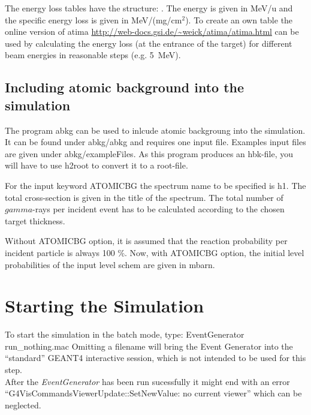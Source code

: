 \documentclass[12pt]{book}
\begin{document}
The energy loss tables have the structure: \hfill{} \linebreak
{}. \hfill{} \linebreak \linebreak
The energy is given in 
MeV/u and the specific energy loss is given in MeV/(mg/cm$^2$).
To create an own table the online version of atima \url{http://web-docs.gsi.de/~weick/atima/atima.html} can be used by calculating the energy loss (at the entrance of the target) for different beam energies in reasonable steps (e.g. 5~MeV).


\subsection{Including atomic background into the simulation}
\label{sec:abkg}

The program abkg can be used to inlcude atomic backgroung into the simulation.
It can be found under abkg/abkg and requires one input file. Examples input files
are given under abkg/exampleFiles.
As this program produces an hbk-file, you will have to use h2root to convert it to
a root-file. 

For the input keyword ATOMICBG the spectrum name to be specified is h1. The total 
cross-section is given in the title of the spectrum. The total number of $gamma$-rays
per incident event has to be calculated according to the chosen target thickness.

Without ATOMICBG option, it is assumed that the reaction probability per incident
particle is always 100 \%. Now, with ATOMICBG option, the initial level probabilities
of the input level schem are given in mbarn.

\section{Starting the Simulation}
To start the simulation in the batch mode, type:\hfill{}
\linebreak \linebreak
{\ttfamily
EventGenerator run\_nothing.mac
}
\linebreak \linebreak
Omitting a filename will bring the Event Generator into the ``standard'' GEANT4 interactive session, which is not 
intended to be used for this step.\\

After the \textit{EventGenerator} has been run sucessfully it might end with an error ``G4VisCommandsViewerUpdate::SetNewValue: no current viewer'' which can be neglected.\\
\end{document}
